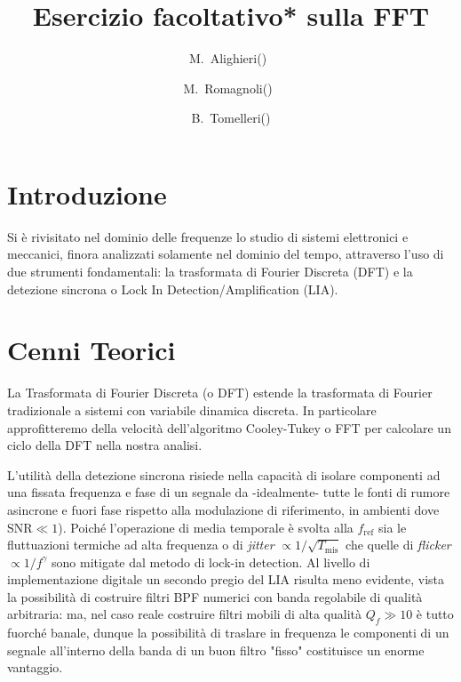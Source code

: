 \documentclass{article}[a4paper, oneside, 11pt]
\title{Esercizio facoltativo* sulla FFT}
\author{M.~Alighieri(\protect\footnotemark[1] )~\and
M.~Romagnoli(\protect\footnotemark[1] )~\and 
B.~Tomelleri(\protect\footnotemark[1] )}%
\begin{document}
\maketitle

\section{Introduzione}
Si è rivisitato nel dominio delle frequenze lo studio di sistemi elettronici
e meccanici, finora analizzati solamente nel dominio del tempo, attraverso l'uso
di due strumenti fondamentali: la trasformata di Fourier Discreta (DFT) e la
detezione sincrona o Lock In Detection/Amplification (LIA).

\section{Cenni Teorici}
La Trasformata di Fourier Discreta (o DFT) estende la trasformata di Fourier
tradizionale a sistemi con variabile dinamica discreta. In particolare
approfitteremo della velocità dell'algoritmo Cooley-Tukey \cite{FFT} o FFT
per calcolare un ciclo della DFT nella nostra analisi.

L'utilità della detezione sincrona risiede nella capacità di isolare
componenti ad una fissata frequenza e fase di un segnale da -idealmente-
tutte le fonti di rumore asincrone e fuori fase rispetto alla modulazione
di riferimento, in ambienti dove $\text{SNR} \ll 1$).
Poiché l'operazione di media temporale è svolta alla $f_{\text{ref}}$ sia
le fluttuazioni termiche ad alta frequenza o di \emph{jitter}
$\propto 1/\sqrt{T_{\text{mis}}}$ che quelle di \emph{flicker}
$\propto 1/f^\gamma$ sono mitigate dal metodo di lock-in detection.
Al livello di implementazione digitale un secondo pregio del LIA risulta meno
evidente, vista la possibilità di costruire filtri BPF numerici con banda
regolabile di qualità arbitraria: ma, nel caso reale costruire
filtri mobili di alta qualità $Q_f \gg 10$ è tutto fuorché banale, dunque la
possibilità di traslare in frequenza le componenti di un segnale all'interno
della banda di un buon filtro "fisso" costituisce un enorme vantaggio.
\end{document}
